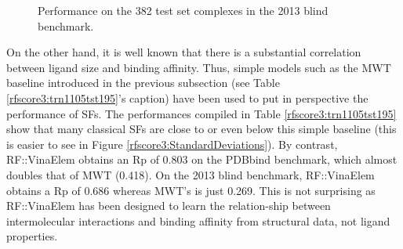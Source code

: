 \begin{figure}
\centering
{}
\caption{Performance on the 382 test set complexes in the 2013 blind benchmark.}
\label{rfscore3:partition5stat}
\end{figure}

On the other hand, it is well known that there is a substantial correlation between ligand size and binding affinity. Thus, simple models such as the MWT baseline introduced in the previous subsection (see Table \ref{rfscore3:trn1105tst195}'s caption) have been used to put in perspective the performance of SFs. The performances compiled in Table \ref{rfscore3:trn1105tst195} show that many classical SFs are close to or even below this simple baseline (this is easier to see in Figure \ref{rfscore3:StandardDeviations}). By contrast, RF::VinaElem obtains an Rp of 0.803 on the PDBbind benchmark, which almost doubles that of MWT (0.418). On the 2013 blind benchmark, RF::VinaElem obtains a Rp of 0.686 whereas MWT's is just 0.269. This is not surprising as RF::VinaElem has been designed to learn the relation-ship between intermolecular interactions and binding affinity from structural data, not ligand properties. 

